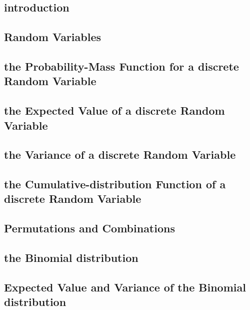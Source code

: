 \documentclass[12pt,]{article}
\theoremstyle{definition}
\theoremstyle{definition}
\theoremstyle{definition}
\theoremstyle{remark}
\begin{document}
\subsection{introduction}\label{introduction-2}

\subsection{Random Variables}\label{random-variables}

\subsection{the Probability-Mass Function for a discrete Random
Variable}\label{the-probability-mass-function-for-a-discrete-random-variable}

\subsection{the Expected Value of a discrete Random
Variable}\label{the-expected-value-of-a-discrete-random-variable}

\subsection{the Variance of a discrete Random
Variable}\label{the-variance-of-a-discrete-random-variable}

\subsection{the Cumulative-distribution Function of a discrete Random
Variable}\label{the-cumulative-distribution-function-of-a-discrete-random-variable}

\subsection{Permutations and
Combinations}\label{permutations-and-combinations}

\subsection{the Binomial distribution}\label{the-binomial-distribution}

\subsection{Expected Value and Variance of the Binomial
distribution}\label{expected-value-and-variance-of-the-binomial-distribution}
\end{document}
